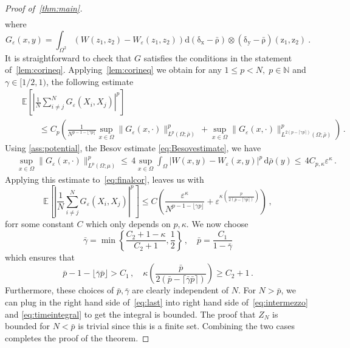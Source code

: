 \documentclass[a4paper,10pt,twoside]{amsart}
\newcommand{\dx}[1]{\,\mathrm{d}#1}  %
\theoremstyle{remark}
\theoremstyle{definition}
\numberwithin{equation}{section}
\newcommand{\eps}{\varepsilon}
\newcommand{\N}{\mathbb{N}}
\newcommand{\0}{{\bf 0}}
\newcommand{\+}{\hspace{-.5ex}+\hspace{-.5ex}}
\begin{document}
\begin{proof}[Proof of~\cref{thm:main}]
\begin{align}
\end{align}
where
\begin{equation}
G_{\eps}(x,y)=\int_{\Omega^2}(W(z_{1},z_{2})-W_{\eps}(z_{1},z_{2}))\mathrm{\mathrm{{d}}(\delta_{x}-\bar\rho)\otimes(\delta_{y}-\bar{\rho})(z_{1},z_{2})}\: .
\end{equation}
It is straightforward to check that $G$ satisfies the conditions in the statement of~\cref{lem:corineq}. Applying~\cref{lem:corineq} we obtain for any $1\leq p<N,\; p \in \N$ and $\gamma \in [1/2,1)$, the following estimate
\begin{eqnarray}
  &&\mathbb{{E}}\left[\left|\frac{1}{N}\sum_{i\neq j}^{N}G_{\eps}(X_{i},X_{j})\right|^{p}\right]\nonumber\\
  &&\qquad\leq C_p\left( \frac{1}{N^{p-1-\lfloor \gamma p \rfloor}} \sup_{x \in \Omega} \lVert  G_{\eps}(x,\cdot)\rVert_{L^p(\Omega;\bar{\rho})}^{p}\, +  \sup_{x \in \Omega} \lVert  G_\eps(x,\cdot)\rVert_{L^{2(p-\lceil \gamma p \rceil)}(\Omega;\bar{\rho})}^{p}\right)\, .\label{eq:finalcor}
\end{eqnarray}
Using \cref{ass:potential}, the Besov estimate \eqref{eq:Besovestimate}, we have
\begin{align}
&\,\sup_{x \in \Omega} \lVert  G_{\eps}(x,\cdot)\rVert_{L^p(\Omega;\mu)}^{p} \leq  \,4 \sup_{x \in \Omega}\int_{\Omega}\left|W(x,y)-W_\eps(x,y)\right|^p \dx{\bar{\rho}}(y)
\leq  \, 4C_{p,\kappa} \eps^{\kappa} \, .
\end{align}
 Applying this estimate to~\eqref{eq:finalcor}, leaves us with
 \begin{equation}
   \mathbb{{E}}\left[\left|\frac{1}{N}\sum_{i\neq j}^{N}G_{\eps}(X_{i},X_{j})\right|^{p}\right]\leq C\left(\frac{\eps^\kappa}{N^{p-1-\lfloor \gamma p \rfloor}}+ \eps^{\kappa\left(\frac{p}{2(p-\lceil \gamma p \rceil)}\right)}\right)\, ,\label{eq:last}
 \end{equation}
 forr some constant $C$ which only depends on $p,\kappa$. We now choose
 \begin{equation}
\bar{\gamma}=\min \left\{\frac{C_2+1-\kappa}{C_2+1},\frac12\right\}\,, \quad \bar{p}= \frac{C_1}{1-\bar{\gamma}}
 \end{equation}
 which ensures that
 \begin{equation}
   \bar{p}-1-\lfloor \bar{\gamma} \bar{p} \rfloor> C_1 \, , \quad \kappa\left(\frac{\bar{p}}{2(\bar{p}-\lceil \bar{\gamma} \bar{p} \rceil)}\right)\geq C_2+1\, .
 \end{equation}
 Furthermore, these choices of $\bar{p},\bar{\gamma}$ are clearly independent of $N$. For $N>\bar{p}$, we can plug in the right hand side of~\eqref{eq:last} into right hand side of~\eqref{eq:intermezzo} and \eqref{eq:timeintegral} to get the integral is bounded. The proof that $Z_{N}$ is bounded for $N<\bar{p}$ is trivial since this is a finite set. Combining the two cases completes the proof of the theorem.
\end{proof}
\end{document}

